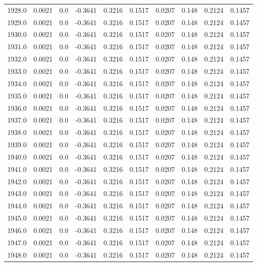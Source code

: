 \begin{longtable}{lrrrrrrrrr}
1928.0 & 0.0021 & 0.0 & -0.3641 & 0.3216 & 0.1517 & 0.0207 & 0.148 & 0.2124 & 0.1457 \\
1929.0 & 0.0021 & 0.0 & -0.3641 & 0.3216 & 0.1517 & 0.0207 & 0.148 & 0.2124 & 0.1457 \\
1930.0 & 0.0021 & 0.0 & -0.3641 & 0.3216 & 0.1517 & 0.0207 & 0.148 & 0.2124 & 0.1457 \\
1931.0 & 0.0021 & 0.0 & -0.3641 & 0.3216 & 0.1517 & 0.0207 & 0.148 & 0.2124 & 0.1457 \\
1932.0 & 0.0021 & 0.0 & -0.3641 & 0.3216 & 0.1517 & 0.0207 & 0.148 & 0.2124 & 0.1457 \\
1933.0 & 0.0021 & 0.0 & -0.3641 & 0.3216 & 0.1517 & 0.0207 & 0.148 & 0.2124 & 0.1457 \\
1934.0 & 0.0021 & 0.0 & -0.3641 & 0.3216 & 0.1517 & 0.0207 & 0.148 & 0.2124 & 0.1457 \\
1935.0 & 0.0021 & 0.0 & -0.3641 & 0.3216 & 0.1517 & 0.0207 & 0.148 & 0.2124 & 0.1457 \\
1936.0 & 0.0021 & 0.0 & -0.3641 & 0.3216 & 0.1517 & 0.0207 & 0.148 & 0.2124 & 0.1457 \\
1937.0 & 0.0021 & 0.0 & -0.3641 & 0.3216 & 0.1517 & 0.0207 & 0.148 & 0.2124 & 0.1457 \\
1938.0 & 0.0021 & 0.0 & -0.3641 & 0.3216 & 0.1517 & 0.0207 & 0.148 & 0.2124 & 0.1457 \\
1939.0 & 0.0021 & 0.0 & -0.3641 & 0.3216 & 0.1517 & 0.0207 & 0.148 & 0.2124 & 0.1457 \\
1940.0 & 0.0021 & 0.0 & -0.3641 & 0.3216 & 0.1517 & 0.0207 & 0.148 & 0.2124 & 0.1457 \\
1941.0 & 0.0021 & 0.0 & -0.3641 & 0.3216 & 0.1517 & 0.0207 & 0.148 & 0.2124 & 0.1457 \\
1942.0 & 0.0021 & 0.0 & -0.3641 & 0.3216 & 0.1517 & 0.0207 & 0.148 & 0.2124 & 0.1457 \\
1943.0 & 0.0021 & 0.0 & -0.3641 & 0.3216 & 0.1517 & 0.0207 & 0.148 & 0.2124 & 0.1457 \\
1944.0 & 0.0021 & 0.0 & -0.3641 & 0.3216 & 0.1517 & 0.0207 & 0.148 & 0.2124 & 0.1457 \\
1945.0 & 0.0021 & 0.0 & -0.3641 & 0.3216 & 0.1517 & 0.0207 & 0.148 & 0.2124 & 0.1457 \\
1946.0 & 0.0021 & 0.0 & -0.3641 & 0.3216 & 0.1517 & 0.0207 & 0.148 & 0.2124 & 0.1457 \\
1947.0 & 0.0021 & 0.0 & -0.3641 & 0.3216 & 0.1517 & 0.0207 & 0.148 & 0.2124 & 0.1457 \\
1948.0 & 0.0021 & 0.0 & -0.3641 & 0.3216 & 0.1517 & 0.0207 & 0.148 & 0.2124 & 0.1457 \\

\end{longtable}
